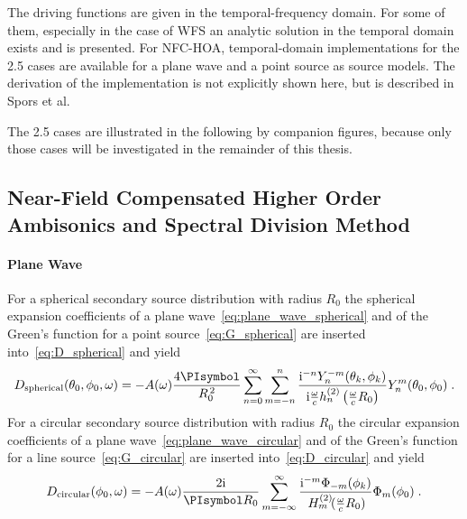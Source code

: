 \documentclass[a4paper]{book}
\newcommand{\reproduce}[1]{%
    \href{#1}{\color{link}\large\Pointinghand}%
}%
\newcommand{\ft}{\footnotesize}                                   %
\newcommand{\PI}{\PIsymbol}%
\newcommand{\I}{\mathrm{i}}                          %
\renewcommand{\vec}[1]{\mathbf{#1}}                  %
\newcommand{\x}{\vec{x}}                             %
\newcommand{\xref}{\x_\text{ref}}                    %
\newcommand{\n}{\vec{n}}                             %
\newcommand{\omegac}{\frac{\omega}{c}}               %
\renewcommand{\H}[2]{\,H_{#1}^{(#2)}\!}              %
\newcommand{\qp}{\;.}                                             %
\def \twohalfD {{2.5\text{D}}\xspace}                             %
\newcommand\eqlabel[2][]{%
  \label{eq:#2}%
}
\begin{document}
{The driving functions are given in the temporal-frequency domain. For some of them,
especially in the case of WFS an analytic solution in the temporal
domain exists and is presented. For NFC-HOA, temporal-domain implementations
for the \twohalfD cases are available for a plane wave and a point source as source models. The
derivation of the implementation is not explicitly shown here, but is described
in Spors et al.\cite{Spors2011b}

The \twohalfD cases are illustrated in the following by companion
figures, because only those cases will be investigated in the remainder of this
thesis.

\subsection{Near-Field Compensated Higher Order Ambisonics and Spectral Division Method}
\label{sec:driving_functions_hoa}


\paragraph{Plane Wave}
%
For a spherical secondary source distribution with radius $R_0$ the spherical
expansion coefficients of a
plane wave~\eqref{eq:plane_wave_spherical} and of the Green's
function for a point source~\eqref{eq:G_spherical} are inserted
into~\eqref{eq:D_spherical} and yield\cite[][(96)]{Schultz2014}
%
\begin{equation}
    D_\text{spherical}(\theta_0,\phi_0,\omega) = -A(\omega) \frac{4\PI}{R_0^{\,2}}
    \sum_{n=0}^\infty \sum_{m=-n}^n \frac{\I^{-n} Y_n^{-m}(\theta_k,\phi_k)}{\I\omegac h_n^{(2)}
    \left(\omegac R_0\right)} Y_n^m(\theta_0,\phi_0) \qp
    \eqlabel{D:hoa:pw:3D}
\end{equation}
%
%    
%
For a circular secondary source distribution with radius $R_0$ the circular
expansion coefficients of a plane wave~\eqref{eq:plane_wave_circular} and
of the Green's function for a line source~\eqref{eq:G_circular} are
inserted into~\eqref{eq:D_circular} and
yield\cite[Compare][(16)]{Ahrens2009c}
%
\begin{equation}
    D_\text{circular}(\phi_0,\omega) = -A(\omega) \frac{2\I}{\PI R_0}
    \sum_{m=-\infty}^\infty \frac{\I^{-m}\Phi_{-m}(\phi_k)}
    {\H{m}{2}(\omegac R_0)} \Phi_m(\phi_0) \qp
    \eqlabel{D:hoa:pw:2D}
\end{equation}
%

}
\end{document}
